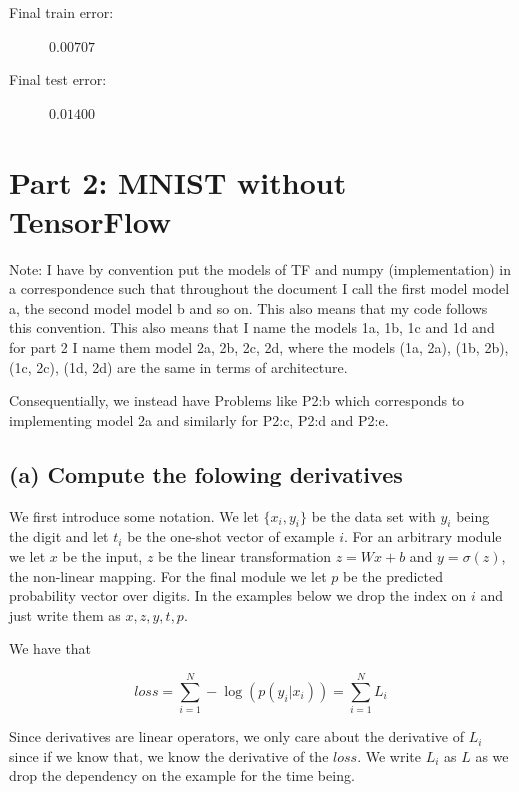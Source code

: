 \documentclass{article}
\begin{document}


\begin{description}
\item[Final train error:] $0.00707$
\item[Final test error:] $0.01400$
\end{description}

\newpage

\section{Part 2: MNIST without TensorFlow}

Note: I have by convention put the models of TF and numpy (implementation) in a
correspondence such that throughout the document I call the first model model a,
the second model model b and so on. This also means that my code follows this
convention. This also means that I name the models 1a,
1b, 1c and 1d and for part 2 I name them model 2a, 2b, 2c, 2d, where the models
(1a, 2a), (1b, 2b), (1c, 2c), (1d, 2d) are the same in terms of architecture.

Consequentially, we instead have Problems like P2:b which corresponds to
implementing model 2a and similarly for P2:c, P2:d and P2:e.

\subsection{(a) Compute the folowing derivatives}

We first introduce some notation. We let $\{x_i, y_i\}$ be the data set with
$y_i$ being the digit and let $t_i$ be the one-shot vector of example $i$.
For an arbitrary module we let $x$ be the input, $z$ be the linear
transformation $z = Wx + b$ and $y = \sigma(z)$, the non-linear mapping. For the
final module we let $p$ be the predicted probability vector over digits. In the
examples below we drop the index on $i$ and just write them as $x, z, y, t, p$.

We have that 

\begin{equation*}
  loss = \sum_{i=1}^N -\log (p(y_i | x_i)) = \sum_{i=1}^N L_i
\end{equation*}

Since derivatives are linear operators, we only care about the derivative of
$L_i$ since if we know that, we know the derivative of the $loss$. We write
$L_i$ as $L$ as we drop the dependency on the example for the time being.
\end{document}
